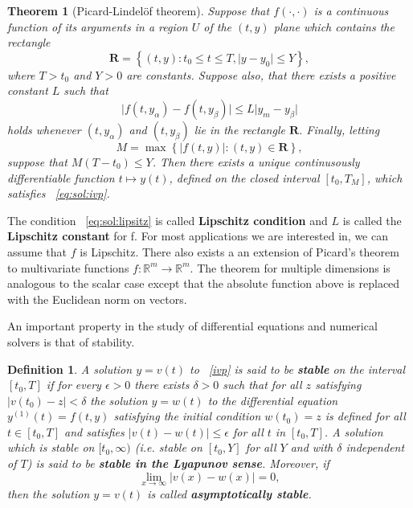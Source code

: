 \documentclass[11pt]{report}
\newtheorem{theorem}{Theorem}
\newtheorem{definition}{Definition}[section]
\begin{document}
    \begin{theorem}[Picard-Lindel\"of theorem]
        Suppose that $f(\cdot , \cdot )$ is a continuous function of its arguments in a region $U$ of the $(t, y)$ plane
        which contains the rectangle
        \begin{equation*}
            \pmb{R}  = \left\{ (t,y) : t_0 \leq t \leq T , \lvert y - y_0 \rvert \leq Y \right\} ,
        \end{equation*}
        where $T > t_0$ and $Y > 0$ are constants.
        Suppose also, that there exists a positive constant $L$ such that
        \begin{equation}
            \label{eq:sol:lipsitz}
            \lvert f(t, y_{\alpha}) - f(t, y_\beta) \rvert \leq L \lvert y_m - y_\beta \rvert
        \end{equation}
        holds whenever $(t, y_\alpha)$ and $(t, y_\beta)$ lie in the rectangle $\pmb{R}$.
        Finally, letting
        \begin{equation*}
            M = \max\left\{\lvert f(t, y) \rvert : (t, y) \in \pmb{R} \right\} ,
        \end{equation*}
        suppose that $M(T - t_0) \leq Y$.
        Then there exists a unique continusously differentiable function $t \mapsto y(t)$, defined on the closed
        interval $[t_0, T_M]$, which satisfies ~\eqref{eq:sol:ivp}.
    \end{theorem}

    The condition ~\eqref{eq:sol:lipsitz} is called \textbf{Lipschitz condition} and $L$ is called the
    \textbf{Lipschitz constant} for f.
    For most applications we are interested in, we can assume that $f$ is Lipschitz.
    There also exists a an extension of Picard's theorem to multivariate functions $f: \mathbb{R}^m \to \mathbb{R}^m$.
    The theorem for multiple dimensions is analogous to the scalar case except that the absolute function above is
    replaced with the Euclidean norm on vectors.

    An important property in the study of differential equations and numerical solvers is that of stability.
    \begin{definition}
        A solution $y = v(t)$ to ~\eqref{ivp} is said to be \textbf{stable} on the interval $[t_0, T ]$ if for every
        $\epsilon >0$ there exists $\delta > 0$ such that for all $z$ satisfying $\lvert  v(t_0) - z \rvert < \delta$
        the solution $y = w(t)$ to the differential equation $y^{(1)}(t) = f(t, y) $ satisfying the initial condition
        $w(t_0) = z$ is defined for all $t \in [t_0, T]$ and satisfies $ \lvert v(t) - w(t) \rvert \leq \epsilon$ for
        all $t$ in $[t_0, T]$.
        A solution which is stable on $[t_0, \infty)$ (i.e. stable on $[t_0, Y]$ for all $Y$ and with $\delta$
        independent of $T$) is said to be \textbf{stable in the Lyapunov sense}.
        Moreover, if
        \begin{equation*}
            \lim_{x\to\infty} \lvert v(x) - w(x) \rvert = 0,
        \end{equation*}
        then the solution $y = v(t)$ is called \textbf{asymptotically stable}.
    \end{definition}
\end{document}
